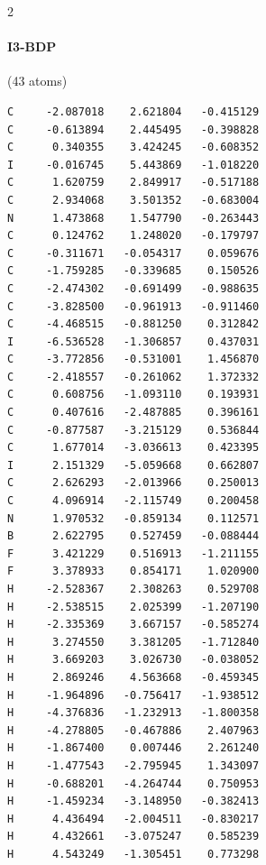 \begin{multicols}{2}
\paragraph{I3-BDP} (43 atoms)
{\scriptsize\linespread{1}\selectfont\begin{verbatim}
C     -2.087018    2.621804   -0.415129
C     -0.613894    2.445495   -0.398828
C      0.340355    3.424245   -0.608352
I     -0.016745    5.443869   -1.018220
C      1.620759    2.849917   -0.517188
C      2.934068    3.501352   -0.683004
N      1.473868    1.547790   -0.263443
C      0.124762    1.248020   -0.179797
C     -0.311671   -0.054317    0.059676
C     -1.759285   -0.339685    0.150526
C     -2.474302   -0.691499   -0.988635
C     -3.828500   -0.961913   -0.911460
C     -4.468515   -0.881250    0.312842
I     -6.536528   -1.306857    0.437031
C     -3.772856   -0.531001    1.456870
C     -2.418557   -0.261062    1.372332
C      0.608756   -1.093110    0.193931
C      0.407616   -2.487885    0.396161
C     -0.877587   -3.215129    0.536844
C      1.677014   -3.036613    0.423395
I      2.151329   -5.059668    0.662807
C      2.626293   -2.013966    0.250013
C      4.096914   -2.115749    0.200458
N      1.970532   -0.859134    0.112571
B      2.622795    0.527459   -0.088444
F      3.421229    0.516913   -1.211155
F      3.378933    0.854171    1.020900
H     -2.528367    2.308263    0.529708
H     -2.538515    2.025399   -1.207190
H     -2.335369    3.667157   -0.585274
H      3.274550    3.381205   -1.712840
H      3.669203    3.026730   -0.038052
H      2.869246    4.563668   -0.459345
H     -1.964896   -0.756417   -1.938512
H     -4.376836   -1.232913   -1.800358
H     -4.278805   -0.467886    2.407963
H     -1.867400    0.007446    2.261240
H     -1.477543   -2.795945    1.343097
H     -0.688201   -4.264744    0.750953
H     -1.459234   -3.148950   -0.382413
H      4.436494   -2.004511   -0.830217
H      4.432661   -3.075247    0.585239
H      4.543249   -1.305451    0.773298
\end{verbatim}}

\end{multicols}
